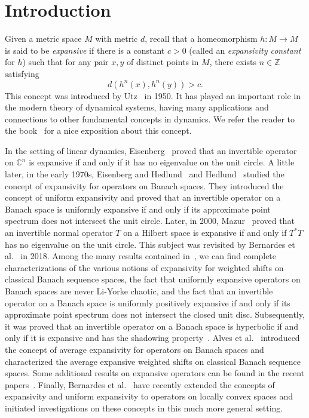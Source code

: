 \documentclass[12pt]{amsart}
\theoremstyle{theorem}
\theoremstyle{definition}
\theoremstyle{remark} \theoremstyle{question} \theoremstyle{example}
\newcommand{\Z}{\mathbb{Z}}   %
\newcommand{\C}{\mathbb{C}}   %
\begin{document}
\section{Introduction}

Given a metric space $M$ with metric $d$, recall that a homeomorphism $h : M \to M$ is said to be {\em expansive} 
if there is a constant $c > 0$ (called an {\em expansivity constant} for $h$) such that for any pair $x,y$ of distinct points in $M$, 
there exists $n \in \Z$ satisfying
\[
d(h^n(x),h^n(y)) > c.
\]
This concept was introduced by Utz~\cite{WUtz50} in 1950. It has played an important role in the modern theory of dynamical systems,
having many applications and connections to other fundamental concepts in dynamics.
We refer the reader to the book~\cite{NAokKHir94} for a nice exposition about this concept.

In the setting of linear dynamics, Eisenberg~\cite{MEis66} proved that an invertible operator on $\C^n$ is expansive if and only if it has no eigenvalue on the unit circle. 
A little later, in the early 1970s, Eisenberg and Hedlund~\cite{MEisJHed70} and Hedlund~\cite{JHed71} studied the concept of expansivity for operators on Banach spaces. 
They introduced the concept of uniform expansivity and proved that an invertible operator on a Banach space is uniformly expansive if and only if its approximate point spectrum does not intersect the unit circle. 
Later, in 2000, Mazur~\cite{MMaz00} proved that an invertible normal operator $T$ on a Hilbert space is expansive if and only if $T^*T$ has no eigenvalue on the unit circle. 
This subject was revisited by Bernardes et al.~\cite{BerCirDarMesPuj18} in 2018.
Among the many results contained in~\cite{BerCirDarMesPuj18}, we can find complete characterizations of the various notions of expansivity for weighted shifts on classical Banach sequence spaces, the fact that uniformly expansive operators on Banach spaces are never Li-Yorke chaotic, and the fact that an invertible operator on a Banach space is uniformly positively expansive if and only if its approximate point spectrum does not intersect the closed unit disc. 
Subsequently, it was proved that an invertible operator on a Banach space is hyperbolic if and only if it is expansive and has the shadowing property~\cite{NBerAMes21,CirGolPuj21}.
Alves et al.~\cite{AlvBerMes21} introduced the concept of average expansivity for operators on Banach spaces and characterized the average expansive weighted shifts on classical Banach sequence spaces.
Some additional results on expansive operators can be found in the recent papers~\cite{AniDarMai22,KLeeCMor22,MMai22}.
Finally, Bernardes et al.~\cite{BCDFP} have recently extended the concepts of expansivity and uniform expansivity to operators on locally convex spaces and initiated investigations on these concepts in this much more general setting.
\end{document}

